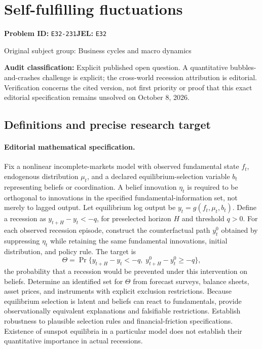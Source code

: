 \documentclass[11pt,a4paper]{article}
\begin{document}
\section*{Self-fulfilling fluctuations}
\textbf{Problem ID:} \texttt{E32-231}\quad \textbf{JEL:} \texttt{E32}\par
\label{problem:OP-0235}
{\sffamily\small\color{muted}Original subject group: Business cycles and macro dynamics\par}
\label{definitions:problem:30007516}
\textbf{Audit classification:} Explicit published open question. A quantitative bubbles-and-crashes challenge is explicit; the cross-world recession attribution is editorial. Verification concerns the cited version, not first priority or proof that this exact editorial specification remains unsolved on October 8, 2026.
\subsection*{Definitions and precise research target}
\paragraph{Editorial mathematical specification.} Fix a nonlinear incomplete-markets model with observed fundamental state \(f_t\), endogenous distribution \(\mu_t\), and a declared equilibrium-selection variable \(b_t\) representing beliefs or coordination. A belief innovation \(\eta_t\) is required to be orthogonal to innovations in the specified fundamental-information set, not merely to lagged output. Let equilibrium log output be \(y_t=g(f_t,\mu_t,b_t)\). Define a recession as \(y_{t+H}-y_t<-q\), for preselected horizon \(H\) and threshold \(q>0\).
For each observed recession episode, construct the counterfactual path \(y^{0}_t\) obtained by suppressing \(\eta_t\) while retaining the same fundamental innovations, initial distribution, and policy rule. The target is
\[
\Theta=\Pr\{y_{t+H}-y_t<-q,\;
y^{0}_{t+H}-y^{0}_t\ge -q\},
\]
the probability that a recession would be prevented under this intervention on beliefs. Determine an identified set for \(\Theta\) from forecast surveys, balance sheets, asset prices, and instruments with explicit exclusion restrictions. Because equilibrium selection is latent and beliefs can react to fundamentals, provide observationally equivalent explanations and falsifiable restrictions. Establish robustness to plausible selection rules and financial-friction specifications. Existence of sunspot equilibria in a particular model does not establish their quantitative importance in actual recessions.
\end{document}
